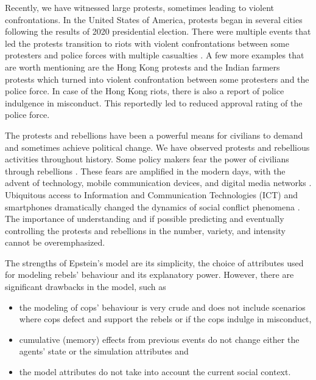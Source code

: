 \documentclass[a4paper,11pt]{article}
\begin{document}
Recently, we have witnessed large protests, sometimes leading to violent confrontations. In the United States of America, protests began in several cities following the results of 2020 presidential election. There were multiple events that led the protests transition to riots with violent confrontations between some protesters and police forces with multiple casualties \cite{enwiki:usprotest}. A few more examples that are worth mentioning are the Hong Kong protests \cite{enwiki:hongkongprotest} and the Indian farmers protests \cite{enwiki:indiafarmprotest} which turned into violent confrontation between some protesters and the police force. In case of the Hong Kong riots, there is also a report of police indulgence in misconduct. This reportedly led to reduced approval rating of the police force\cite{enwiki:hongkongprotest}.

The protests and rebellions have been a powerful means for civilians to demand and sometimes achieve political change. We have observed protests and rebellious activities throughout history. Some policy makers fear the power of civilians through rebellions \cite{thecrowd}. These fears are amplified in the modern days, with the advent of technology, mobile communication devices, and digital media networks \cite{phdthesisfaris, Rheingold2002SmartMT}. Ubiquitous access to Information and Communication Technologies (ICT) and smartphones dramatically changed the dynamics of social conflict phenomena \cite{phdthesisfaris, twitterarticle}. The importance of understanding and if possible predicting and eventually controlling the protests and rebellions in the number, variety, and intensity cannot be overemphasized\cite{stateofartreview}.

The strengths of Epstein's model are its simplicity, the choice of attributes used for modeling rebels' behaviour and its explanatory power. However, there are significant drawbacks in the model, such as 
\begin{itemize}
    \item the modeling of cops’ behaviour is very crude and does not include scenarios where cops defect and support the rebels or if the cops indulge in misconduct,
    \item cumulative (memory) effects from previous events do not change either the agents’ state or the simulation attributes and
    \item the model attributes do not take into account the current social context.
\end{itemize}
\end{document}
